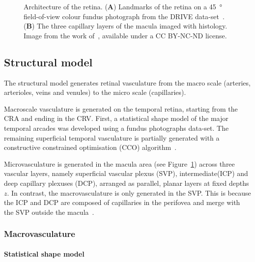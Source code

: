 \documentclass[11pt,]{article}
\begin{document}
\begin{figure}[ht!]
  \caption{Architecture of the retina. (\textbf{A}) Landmarks of the retina on a \SI{45}{\degree} field-of-view colour fundus photograph from the DRIVE data-set~\cite{Staal_2004}.
  (\textbf{B}) The three capillary layers of the macula imaged with histology. Image from the work of~\citet{An2020}, available under a CC BY-NC-ND license.}
  \label{fig:1}
\end{figure}

\subsection{Structural model}\label{sec:structModel}

The structural model generates retinal vasculature from the macro
scale (arteries, arterioles, veins and venules) to the micro scale
(capillaries).

Macroscale vasculature is generated on the temporal retina, starting
from the CRA and ending in the CRV.  First, a statistical shape model
of the major temporal arcades was developed using a fundus
photographs data-set.  The remaining superficial temporal vasculature is
partially generated with a constructive constrained optimisation (CCO)
algorithm~\cite{Talou2021}.

Microvasculature is generated in the macula area (see
Figure~\ref{fig:1}) across three vascular layers, namely superficial
vascular plexus (SVP), intermediate(ICP) and deep capillary plexuses
(DCP), arranged as parallel, planar layers at fixed depths \(z\).
In contrast, the macrovasculature is only generated in the SVP.
This is because the ICP and DCP are composed of capillaries in the perifovea and merge with the SVP outside the macula~\cite{An2021}.

\subsubsection{Macrovasculature}

\paragraph{Statistical shape model}
\end{document}
